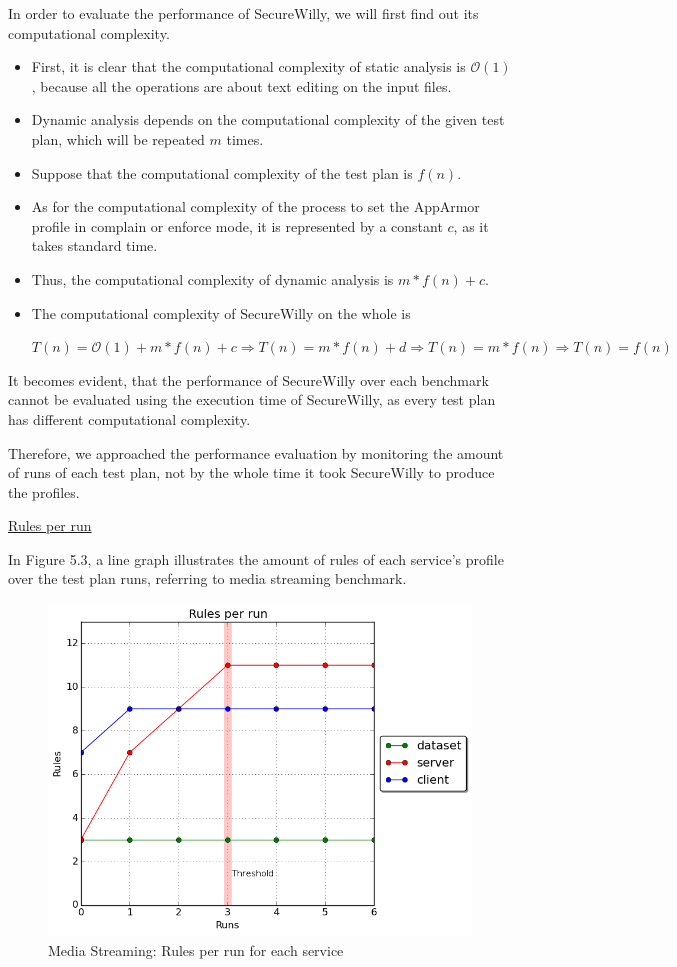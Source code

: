 In order to evaluate the performance of SecureWilly, we will first find out its computational complexity.

\begin{itemize}
\item First, it is clear that the computational complexity of static analysis is $\mathcal{O}(1)$, because all the operations are about text editing on the input files.
\item Dynamic analysis depends on the computational complexity of the given test plan, which will be repeated $m$ times.

\item Suppose that the computational complexity of the test plan is $f(n)$.

\item As for the computational complexity of the process to set the AppArmor profile in complain or enforce mode, it is represented by a constant $c$, as it takes standard time.

\item Thus, the computational complexity of dynamic analysis is $m*f(n) + c$.

\item The computational complexity of SecureWilly on the whole is

$T(n) = \mathcal{O}(1) + m*f(n) + c \Rightarrow T(n) = m*f(n) + d \Rightarrow T(n) = m*f(n) \Rightarrow T(n) = f(n)$

\end{itemize}

It becomes evident, that the performance of SecureWilly over each benchmark cannot be evaluated using the execution time of SecureWilly, as every test plan has different computational complexity.

Therefore, we approached the performance evaluation by monitoring the amount of runs of each test plan, not by the whole time it took SecureWilly to produce the profiles.

\hfill\break
\underline{Rules per run}
\hfill\break

In Figure 5.3, a line graph illustrates the amount of rules of each service's profile over the test plan runs, referring to media streaming benchmark.

\begin{figure}[h!]
  \centering
   \includegraphics[width=0.70\linewidth]{../figures/mediastreaming/rulesthreshold.png}
   \caption{Media Streaming: Rules per run for each service}
\end{figure}

